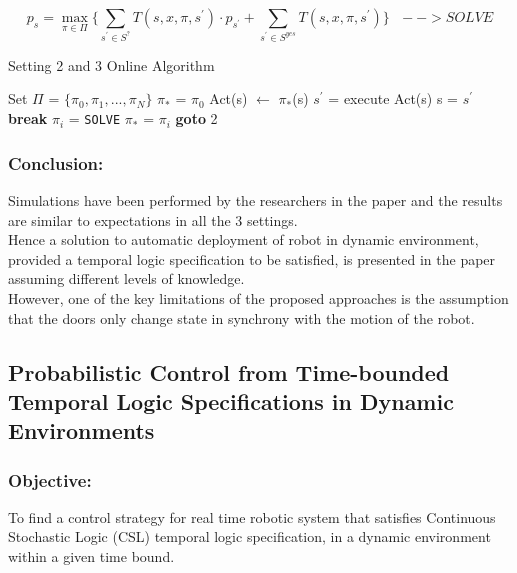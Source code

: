 \documentclass{article}
\theoremstyle{definition}
\begin{document}
\begin{enumerate}
\begin{itemize}
        \[ p_s = \max_{\pi\in\Pi} \{ \sum_{s^{'}\in S^{?}} T(s,x,\pi,s^{'})\cdot p_{s^{'}}  + \sum_{s^{'}\in S^{yes}} T(s,x,\pi,s^{'})  \} \ \ \ --> SOLVE  \]
        \begin{algorithm}
        \caption{Setting 2 and 3 Online Algorithm \cite{sahil1}}\label{euclid}
        \begin{algorithmic}[1]
        \REQUIRE Set $\Pi$ = $\{ \pi_0,\pi_1,...,\pi_N \}$
        \STATE $\pi_*$ = $\pi_0$
        \STATE Act(s) $\leftarrow$ $\pi_*$(s)
        \STATE $s^{'}$ = execute Act(s)
        \STATE s = $s^{'}$
        \STATE \textbf{break}
        \ELSE
        \STATE $\pi_i$ = \texttt{SOLVE}
        \STATE $\pi_*$ = $\pi_i$
        \ENDIF
        \STATE \textbf{goto} 2
        \ENDIF
        \ENDWHILE
        \end{algorithmic}
        \end{algorithm}
    \end{itemize}
\end{enumerate}


\subsubsection{Conclusion:}
Simulations have been performed by the researchers in the paper \cite{sahil1} and the results are similar to expectations in all the 3 settings.\\
Hence a solution to automatic deployment of robot in dynamic environment, provided a temporal logic specification to be satisfied, is presented in the paper assuming different levels of knowledge.\\
However, one of the key limitations of the proposed approaches is the assumption that the doors only change state in synchrony with the motion of the robot.

\subsection{Probabilistic Control from Time-bounded Temporal Logic Specifications in Dynamic Environments}
\subsubsection{Objective:}
To find a control strategy for real time robotic system that satisfies Continuous Stochastic Logic (CSL) temporal logic specification, in a dynamic environment within a given time bound.
\end{document}
